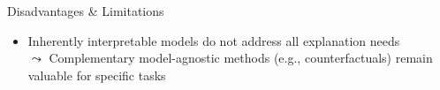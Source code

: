 \documentclass[10pt,compress,t,notes=noshow, xcolor=table]{beamer}
\begin{document}
\begin{frame}{Disadvantages \& Limitations}
\begin{itemize}
     \item<4-> Inherently interpretable models do not address all explanation needs\\
$\leadsto$ Complementary model-agnostic methods (e.g., counterfactuals) remain valuable for specific tasks
\end{itemize}
\end{frame}
\end{document}
